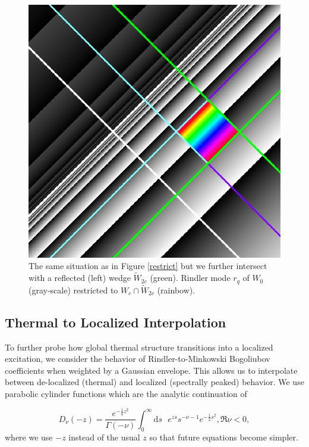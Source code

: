 \documentclass[12pt,a4paper]{article}
\newcommand{\dv}[1]{\mathrm{d} #1 \text{ }}
\begin{document}
{\begin{figure}[h]
  \centering
\includegraphics[scale=0.4]{diamond_in_wedge.png}
\caption{The same situation as in Figure \ref{restrict} but we further intersect with a reflected (left) wedge $\widetilde{W}_{2c}$ (green). Rindler mode $r_q$ of $W_0$ (gray-scale) restricted to $W_c \cap \widetilde{W}_{2c}$ (rainbow).}
\label{diamond}
\end{figure}


\subsection{Thermal to Localized Interpolation}
To further probe how global thermal structure transitions into a localized excitation, we consider the behavior of Rindler-to-Minkowski Bogoliubov coefficients when weighted by a Gaussian envelope. This allows us to interpolate between de-localized (thermal) and localized (spectrally peaked) behavior. We use parabolic cylinder functions \cite{AbramowitzStegun1964,Olver1959UniformAE} which are the analytic continuation of 

\begin{equation}
D_\nu(-z) = \frac{e^{-\frac{1}{4}z^2}}{\Gamma\left(-\nu\right)} \int_0^\infty  \dv{s} e^{zs} s^{-\nu - 1} e^{-\frac{1}{2} s^2}, \mathfrak{R}\nu < 0,
\end{equation}
where we use $-z$ instead of the usual $z$ so that future equations become simpler.


}
\end{document}
